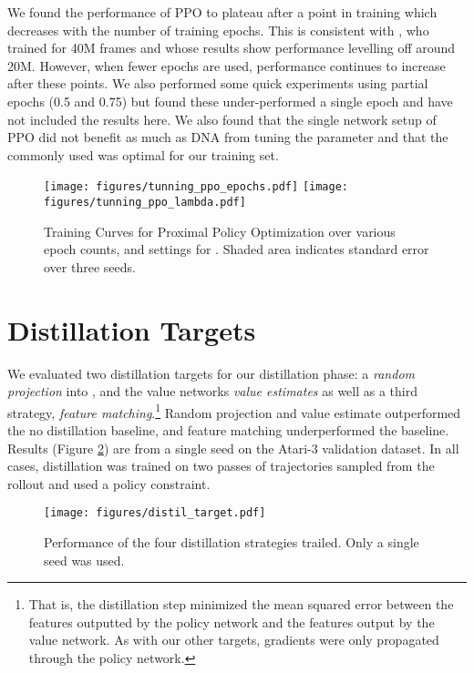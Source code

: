 \documentclass{article}
\begin{document}
We found the performance of PPO to plateau after a point in training which decreases with the number of training epochs. This is consistent with \cite{schulman2017proximal}, who trained for 40M frames and whose results show performance levelling off around 20M. However, when fewer epochs are used, performance continues to increase after these points. We also performed some quick experiments using partial epochs (0.5 and 0.75) but found these under-performed a single epoch and have not included the results here. We also found that the single network setup of PPO did not benefit as much as DNA from tuning the  parameter and that the commonly used  was optimal for our training set.

\begin{figure}[!h]
    \centering
    \texttt{[image: figures/tunning\_ppo\_epochs.pdf]}
    \texttt{[image: figures/tunning\_ppo\_lambda.pdf]}
    \caption{Training Curves for Proximal Policy Optimization over various epoch counts, and settings for . Shaded area indicates standard error over three seeds.}
    \label{fig:ppo_hps}
\end{figure}

\section{Distillation Targets}
\label{app:distil_targets}

We evaluated two distillation targets for our distillation phase: a \textit{random projection} into , and the value networks \textit{value estimates} as well as a third strategy, \textit{feature matching}.\footnote{That is, the distillation step minimized the mean squared error between the features outputted by the policy network and the features output by the value network. As with our other targets, gradients were only propagated through the policy network.} Random projection and value estimate outperformed the no distillation baseline, and feature matching underperformed the baseline. Results (Figure \ref{fig:distil_target}) are from a single seed on the Atari-3 validation dataset. In all cases, distillation was trained on two passes of trajectories sampled from the rollout and used a policy constraint.

\begin{figure}[h]
    \centering
    \texttt{[image: figures/distil\_target.pdf]}
    \caption{Performance of the four distillation strategies trailed. Only a single seed was used.}
    \label{fig:distil_target}
\end{figure}
\end{document}

